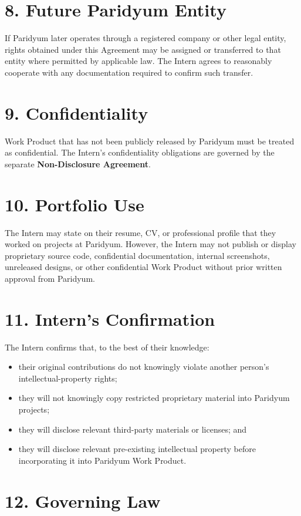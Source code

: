 \documentclass{paridyum}
\begin{document}
\section*{8. Future Paridyum Entity}
If Paridyum later operates through a registered company or other legal entity, rights
obtained under this Agreement may be assigned or transferred to that entity where
permitted by applicable law. The Intern agrees to reasonably cooperate with any
documentation required to confirm such transfer.

\section*{9. Confidentiality}
Work Product that has not been publicly released by Paridyum must be treated as
confidential. The Intern's confidentiality obligations are governed by the separate
\textbf{Non-Disclosure Agreement}.

\section*{10. Portfolio Use}
The Intern may state on their resume, CV, or professional profile that they worked on
projects at Paridyum. However, the Intern may not publish or display proprietary source
code, confidential documentation, internal screenshots, unreleased designs, or other
confidential Work Product without prior written approval from Paridyum.

\section*{11. Intern's Confirmation}
The Intern confirms that, to the best of their knowledge:
\begin{itemize}[leftmargin=*, noitemsep]
    \item their original contributions do not knowingly violate another person's
          intellectual-property rights;
    \item they will not knowingly copy restricted proprietary material into Paridyum
          projects;
    \item they will disclose relevant third-party materials or licenses; and
    \item they will disclose relevant pre-existing intellectual property before
          incorporating it into Paridyum Work Product.
\end{itemize}

\section*{12. Governing Law}

\end{document}
